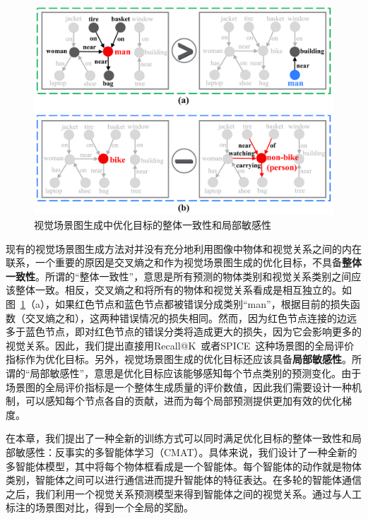 \begin{figure}[htbp]
    \centering
    \includegraphics[width=0.95\linewidth]{chapter4/res/motivation.pdf}
    \caption{视觉场景图生成中优化目标的整体一致性和局部敏感性}
    \label{ch4:fig:motivation}
\end{figure}


现有的视觉场景图生成方法对并没有充分地利用图像中物体和视觉关系之间的内在联系，一个重要的原因是交叉熵之和作为视觉场景图生成的优化目标，不具备\textbf{整体一致性}。所谓的“整体一致性”，意思是所有预测的物体类别和视觉关系类别之间应该整体一致。相反，交叉熵之和将所有的物体和视觉关系看成是相互独立的。如图~\ref{ch4:fig:motivation}（a），如果红色节点和蓝色节点都被错误分成类别“man”，根据目前的损失函数（交叉熵之和），这两种错误情况的损失相同。然而，因为红色节点连接的边远多于蓝色节点，即对红色节点的错误分类将造成更大的损失，因为它会影响更多的视觉关系。因此，我们提出直接用Recall@K~\cite{lu2016visual}或者SPICE~\cite{anderson2016spice}这种场景图的全局评价指标作为优化目标。另外，视觉场景图生成的优化目标还应该具备\textbf{局部敏感性}。所谓的“局部敏感性”，意思是优化目标应该能够感知每个节点类别的预测变化。由于场景图的全局评价指标是一个整体生成质量的评价数值，因此我们需要设计一种机制，可以感知每个节点各自的贡献，进而为每个局部预测提供更加有效的优化梯度。


在本章，我们提出了一种全新的训练方式可以同时满足优化目标的整体一致性和局部敏感性：反事实的多智能体学习（CMAT）。具体来说，我们设计了一种全新的多智能体模型，其中将每个物体框看成是一个智能体。每个智能体的动作就是物体类别，智能体之间可以进行通信进而提升智能体的特征表达。在多轮的智能体通信之后，我们利用一个视觉关系预测模型来得到智能体之间的视觉关系。通过与人工标注的场景图对比，得到一个全局的奖励。

